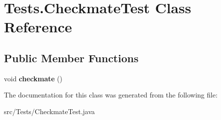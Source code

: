 \hypertarget{class_tests_1_1_checkmate_test}{}\section{Tests.\+Checkmate\+Test Class Reference}
\label{class_tests_1_1_checkmate_test}
\subsection*{Public Member Functions}
\begin{DoxyCompactItemize}
\item 
\mbox{\label{class_tests_1_1_checkmate_test_adf6782d7c9679ccb7e986c1eb62c205f}} 
void {\bfseries checkmate} ()
\end{DoxyCompactItemize}


The documentation for this class was generated from the following file\+:\begin{DoxyCompactItemize}
\item 
src/\+Tests/Checkmate\+Test.\+java\end{DoxyCompactItemize}
